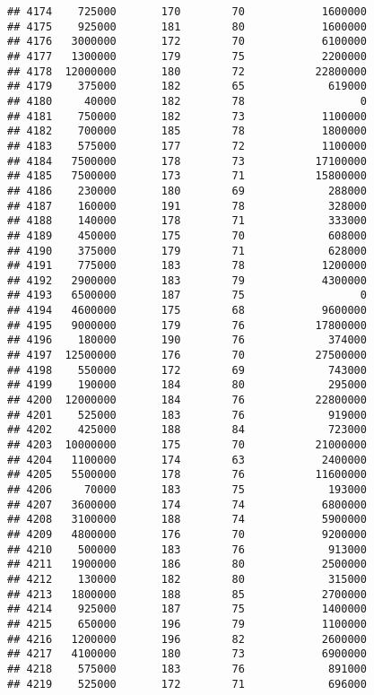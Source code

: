 \documentclass[
]{article}
\begin{document}
\begin{verbatim}
## 4174    725000       170        70            1600000
## 4175    925000       181        80            1600000
## 4176   3000000       172        70            6100000
## 4177   1300000       179        75            2200000
## 4178  12000000       180        72           22800000
## 4179    375000       182        65             619000
## 4180     40000       182        78                  0
## 4181    750000       182        73            1100000
## 4182    700000       185        78            1800000
## 4183    575000       177        72            1100000
## 4184   7500000       178        73           17100000
## 4185   7500000       173        71           15800000
## 4186    230000       180        69             288000
## 4187    160000       191        78             328000
## 4188    140000       178        71             333000
## 4189    450000       175        70             608000
## 4190    375000       179        71             628000
## 4191    775000       183        78            1200000
## 4192   2900000       183        79            4300000
## 4193   6500000       187        75                  0
## 4194   4600000       175        68            9600000
## 4195   9000000       179        76           17800000
## 4196    180000       190        76             374000
## 4197  12500000       176        70           27500000
## 4198    550000       172        69             743000
## 4199    190000       184        80             295000
## 4200  12000000       184        76           22800000
## 4201    525000       183        76             919000
## 4202    425000       188        84             723000
## 4203  10000000       175        70           21000000
## 4204   1100000       174        63            2400000
## 4205   5500000       178        76           11600000
## 4206     70000       183        75             193000
## 4207   3600000       174        74            6800000
## 4208   3100000       188        74            5900000
## 4209   4800000       176        70            9200000
## 4210    500000       183        76             913000
## 4211   1900000       186        80            2500000
## 4212    130000       182        80             315000
## 4213   1800000       188        85            2700000
## 4214    925000       187        75            1400000
## 4215    650000       196        79            1100000
## 4216   1200000       196        82            2600000
## 4217   4100000       180        73            6900000
## 4218    575000       183        76             891000
## 4219    525000       172        71             696000

\end{verbatim}
\end{document}
